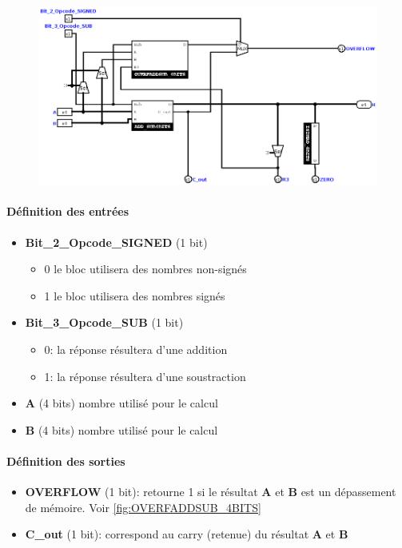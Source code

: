 \documentclass[a4paper]{article}
\begin{document}
\begin{tcolorbox}[colframe=Monokaimagenta,colback=white]
\begin{figure}[H]
    \centering
    \includegraphics[width=\textwidth]{src/ADDSUB_4BITS.png}
\end{figure}

\paragraph{Définition des entrées}
\begin{itemize}
\item \textbf{Bit\_2\_Opcode\_SIGNED} (1 bit)
     \begin{itemize}
            \item 0 le bloc utilisera des nombres non-signés
            \item 1 le bloc utilisera des nombres signés
        \end{itemize}
\item \textbf{Bit\_3\_Opcode\_SUB} (1 bit) 
    \begin{itemize}
            \item 0: la réponse résultera d'une addition
            \item 1: la réponse résultera d'une soustraction
        \end{itemize}
\item \textbf{A} (4 bits) nombre utilisé pour le calcul 
\item \textbf{B} (4 bits) nombre utilisé pour le calcul 
\end{itemize}

\paragraph{Définition des sorties}
\begin{itemize}
\item \textbf{OVERFLOW} (1 bit): retourne 1 si le résultat \textbf{A} et \textbf{B} est un dépassement de mémoire. Voir \ref{fig:OVERFADDSUB_4BITS}
\item \textbf{C\_out} (1 bit): correspond au carry (retenue) du résultat \textbf{A} et \textbf{B}


\end{itemize}
\end{tcolorbox}
\end{document}
